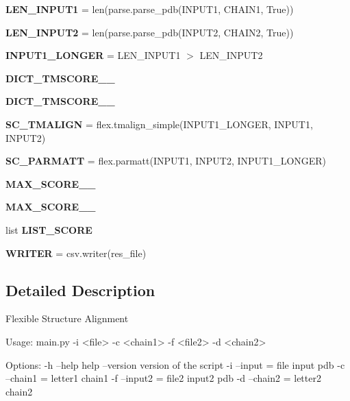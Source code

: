 \begin{DoxyCompactItemize}
\mbox{\label{namespacemain_a1637d07f8b137636fcf32ac678401ba2}} 
{\bfseries L\+E\+N\+\_\+\+I\+N\+P\+U\+T1} = len(parse.\+parse\+\_\+pdb(I\+N\+P\+U\+T1, C\+H\+A\+I\+N1, True))
\item 
\mbox{\label{namespacemain_a5abf3cba80d15e0795ab99ed9be4ea9e}} 
{\bfseries L\+E\+N\+\_\+\+I\+N\+P\+U\+T2} = len(parse.\+parse\+\_\+pdb(I\+N\+P\+U\+T2, C\+H\+A\+I\+N2, True))
\item 
\mbox{\label{namespacemain_a2b97349bbc6dc490a85adefcd0d73aa9}} 
{\bfseries I\+N\+P\+U\+T1\+\_\+\+L\+O\+N\+G\+ER} = L\+E\+N\+\_\+\+I\+N\+P\+U\+T1 $>$ L\+E\+N\+\_\+\+I\+N\+P\+U\+T2
\item 
{\bfseries D\+I\+C\+T\+\_\+\+T\+M\+S\+C\+O\+R\+E\+\_\+\_}
\item 
{\bfseries D\+I\+C\+T\+\_\+\+T\+M\+S\+C\+O\+R\+E\+\_\+\_}
\item 
\mbox{\label{namespacemain_afcf0a80d605cea98b7c578528251ba34}} 
{\bfseries S\+C\+\_\+\+T\+M\+A\+L\+I\+GN} = flex.\+tmalign\+\_\+simple(I\+N\+P\+U\+T1\+\_\+\+L\+O\+N\+G\+ER, I\+N\+P\+U\+T1, I\+N\+P\+U\+T2)
\item 
\mbox{\label{namespacemain_ab9505d02ba80c3fc0844677253cc0a23}} 
{\bfseries S\+C\+\_\+\+P\+A\+R\+M\+A\+TT} = flex.\+parmatt(I\+N\+P\+U\+T1, I\+N\+P\+U\+T2, I\+N\+P\+U\+T1\+\_\+\+L\+O\+N\+G\+ER)
\item 
{\bfseries M\+A\+X\+\_\+\+S\+C\+O\+R\+E\+\_\+\_}
\item 
{\bfseries M\+A\+X\+\_\+\+S\+C\+O\+R\+E\+\_\+\_}
\item 
list {\bfseries L\+I\+S\+T\+\_\+\+S\+C\+O\+RE}
\item 
\mbox{\label{namespacemain_ac3e6d8fc79df030a62b4fbac193d6e64}} 
{\bfseries W\+R\+I\+T\+ER} = csv.\+writer(res\+\_\+file)
\end{DoxyCompactItemize}


\subsection{Detailed Description}
\begin{DoxyVerb}Flexible Structure Alignment

Usage:
  main.py -i <file> -c <chain1> -f <file2> -d <chain2>

Options:
  -h --help                  help
  --version                  version of the script
  -i --input = file          input pdb
  -c --chain1 = letter1      chain1
  -f --input2 = file2        input2 pdb
  -d --chain2 = letter2      chain2
\end{DoxyVerb}
 

